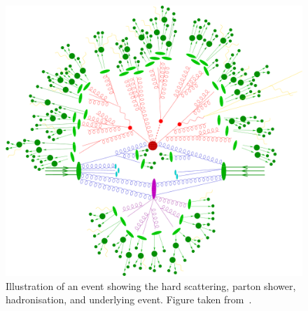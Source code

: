\begin{figure}[ht]
  \centering
 \includegraphics[width=.9\textwidth]{event.png} 
 \caption{Illustration of an event showing the hard scattering, parton shower, hadronisation, and underlying event. Figure taken from~\cite{Hoche:2014rga}.}
 \label{fig:event}
\end{figure}

